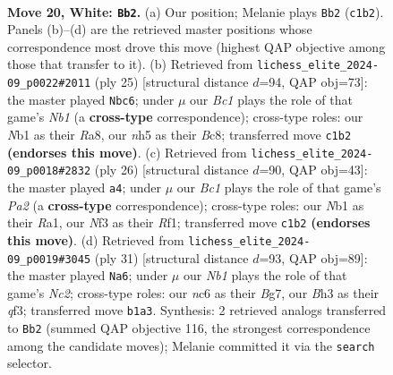 \documentclass[11pt]{article}
\begin{document}
\clearpage

\begin{figure}[p]\centering
\begin{subfigure}{0.46\textwidth}\centering
\resizebox{\linewidth}{!}{%
\newchessgame
\chessboard[
  setfen={r1b1k2r/p3b1pp/1pnq4/3p1p1n/Pp1P3P/4PNPB/R3QP2/1NB1R1K1 w - - 3 20},
  showmover=false,
  pgfstyle=straightmove, color=movearrow, markmove={c1-b2}
]}
\caption{}
\end{subfigure}\hfill
\begin{subfigure}{0.46\textwidth}\centering
\resizebox{\linewidth}{!}{%
\newchessgame
\chessboard[
  setfen={rnbq1rk1/p1p1n1b1/1p1p1pp1/8/3BP2P/2N4N/PPP2PQ1/R3KB1R b KQ - 0 13},
  showmover=false,
  pgfstyle=straightmove, color=movearrow, markmove={b8-c6}
]}
\caption{}
\end{subfigure}
\\[4pt]
\begin{subfigure}{0.46\textwidth}\centering
\resizebox{\linewidth}{!}{%
\newchessgame
\chessboard[
  setfen={r1bq1rk1/ppb2p2/2p2np1/5p1p/1PNP3P/4P1P1/P3NPB1/R2Q1RK1 w - - 3 14},
  showmover=false,
  pgfstyle=straightmove, color=movearrow, markmove={a2-a4}
]}
\caption{}
\end{subfigure}\hfill
\begin{subfigure}{0.46\textwidth}\centering
\resizebox{\linewidth}{!}{%
\newchessgame
\chessboard[
  setfen={r2q1rk1/1pnn1pbp/4p1p1/p2pP3/P2P4/1N3QPP/1P3PB1/R1B1R1K1 b - - 0 16},
  showmover=false,
  pgfstyle=straightmove, color=movearrow, markmove={c7-a6}
]}
\caption{}
\end{subfigure}
\caption{\textbf{Move 20, White: \texttt{Bb2}.} (a) Our position; Melanie plays \texttt{Bb2} (\texttt{c1b2}). Panels (b)--(d) are the retrieved master positions whose correspondence most drove this move (highest QAP objective among those that transfer to it). (b) Retrieved from \texttt{lichess\_elite\_2024-09\_p0022\#2011} (ply 25) [structural distance $d$=94, QAP obj=73]: the master played \texttt{Nbc6}; under $\mu$ our \emph{Bc1} plays the role of that game's \emph{Nb1} (a \textbf{cross-type} correspondence); cross-type roles: our \emph{N}b1 as their \emph{R}a8, our \emph{n}h5 as their \emph{B}c8; transferred move \texttt{c1b2} \textbf{(endorses this move)}. (c) Retrieved from \texttt{lichess\_elite\_2024-09\_p0018\#2832} (ply 26) [structural distance $d$=90, QAP obj=43]: the master played \texttt{a4}; under $\mu$ our \emph{Bc1} plays the role of that game's \emph{Pa2} (a \textbf{cross-type} correspondence); cross-type roles: our \emph{N}b1 as their \emph{R}a1, our \emph{N}f3 as their \emph{R}f1; transferred move \texttt{c1b2} \textbf{(endorses this move)}. (d) Retrieved from \texttt{lichess\_elite\_2024-09\_p0019\#3045} (ply 31) [structural distance $d$=93, QAP obj=89]: the master played \texttt{Na6}; under $\mu$ our \emph{Nb1} plays the role of that game's \emph{Nc2}; cross-type roles: our \emph{n}c6 as their \emph{B}g7, our \emph{B}h3 as their \emph{q}f3; transferred move \texttt{b1a3}. Synthesis: 2 retrieved analogs transferred to \texttt{Bb2} (summed QAP objective 116, the strongest correspondence among the candidate moves); Melanie committed it via the \texttt{search} selector.}
\label{fig:thought-m38}
\end{figure}
\end{document}
